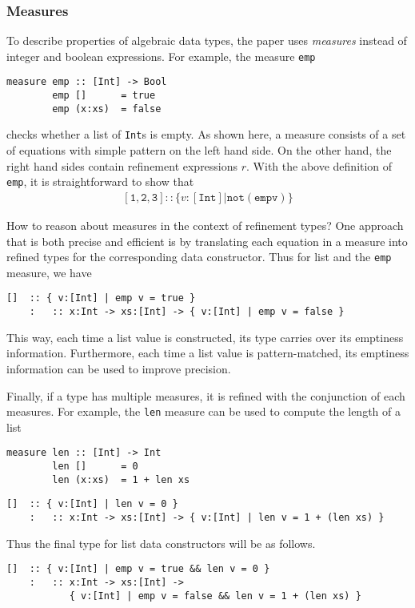 \documentclass[a4paper,UKenglish]{lipics-v2016}
\begin{document}
\subsubsection{Measures}
To describe properties of algebraic data types, the paper uses \emph{measures}
instead of integer and boolean expressions.  For example, the measure
\texttt{emp}
\begin{lstlisting}[abovecaptionskip=-\medskipamount]
    measure emp :: [Int] -> Bool
        emp []      = true
        emp (x:xs)  = false 
\end{lstlisting}
checks whether a list of \texttt{Int}s is empty.  As shown here, a measure
consists of a set of equations with simple pattern on the left hand side.  On
the other hand, the right hand sides contain refinement expressions $r$.  With
the above definition of \texttt{emp}, it is straightforward to show that
\begin{align*}
    \mathtt{[1,2,3]}::\{v:\mathtt{[Int]}|\mathtt{not (emp v)}\}
\end{align*}

How to reason about measures in the context of refinement types?  One approach
that is both precise and efficient is by translating each equation in a measure
into refined types for the corresponding data constructor.  Thus for list and
the \texttt{emp} measure, we have
\begin{lstlisting}[abovecaptionskip=-\medskipamount]
    []  :: { v:[Int] | emp v = true }
    :   :: x:Int -> xs:[Int] -> { v:[Int] | emp v = false } 
\end{lstlisting}
This way, each time a list value is constructed, its type carries over its
emptiness information.  Furthermore, each time a list value is pattern-matched,
its emptiness information can be used to improve precision.

Finally, if a type has multiple measures, it is refined with the conjunction of
each measures.  For example, the \texttt{len} measure can be used to compute
the length of a list
\begin{lstlisting}[abovecaptionskip=-\medskipamount]
    measure len :: [Int] -> Int
        len []      = 0
        len (x:xs)  = 1 + len xs 
\end{lstlisting}
\begin{lstlisting}[abovecaptionskip=-\medskipamount]
    []  :: { v:[Int] | len v = 0 }
    :   :: x:Int -> xs:[Int] -> { v:[Int] | len v = 1 + (len xs) } 
\end{lstlisting}
Thus the final type for list data constructors will be as follows.
\begin{lstlisting}[abovecaptionskip=-\medskipamount]
    []  :: { v:[Int] | emp v = true && len v = 0 }
    :   :: x:Int -> xs:[Int] -> 
           { v:[Int] | emp v = false && len v = 1 + (len xs) } 
\end{lstlisting}
\end{document}
